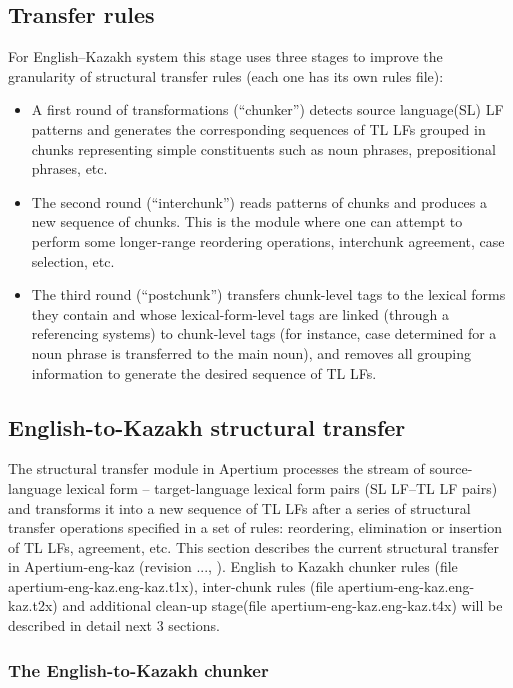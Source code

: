 \documentclass[11pt]{article}
\begin{document}
\subsection{Transfer rules}

For English–Kazakh system this stage uses three stages to improve the granularity of structural transfer rules (each one has its own rules file):
\begin{itemize}
\item A first round of transformations (``chunker'') detects source language(SL) LF patterns and generates the corresponding sequences of TL LFs grouped in chunks representing simple constituents such as noun phrases, prepositional phrases, etc. 
\item The second round (``interchunk'') reads patterns of chunks and produces a new sequence of chunks. This is the module where one can attempt to perform some longer-range reordering operations, interchunk agreement, case selection, etc. 
\item The third round (``postchunk'') transfers chunk-level tags to the lexical forms they contain and whose lexical-form-level tags are linked (through a referencing systems) to chunk-level tags (for instance, case determined for a noun phrase is transferred to the main noun), and removes all grouping information to generate the desired sequence of TL LFs.
\end{itemize}

\subsection{English-to-Kazakh structural transfer}

The structural transfer module in Apertium processes the stream of source-language lexical form – target-language lexical form pairs (SL LF–TL LF pairs) and transforms it into a new sequence of TL LFs after a series of structural transfer operations specified in a set of rules: reordering, elimination or insertion of TL LFs, agreement, etc. 
This section describes the current structural transfer in Apertium-eng-kaz (revision ..., ). English to Kazakh chunker rules (file apertium-eng-kaz.eng-kaz.t1x), inter-chunk rules (file apertium-eng-kaz.eng-kaz.t2x) and additional clean-up stage(file apertium-eng-kaz.eng-kaz.t4x) will be described in detail next 3 sections. 

\subsubsection{The English-to-Kazakh chunker}
\end{document}
